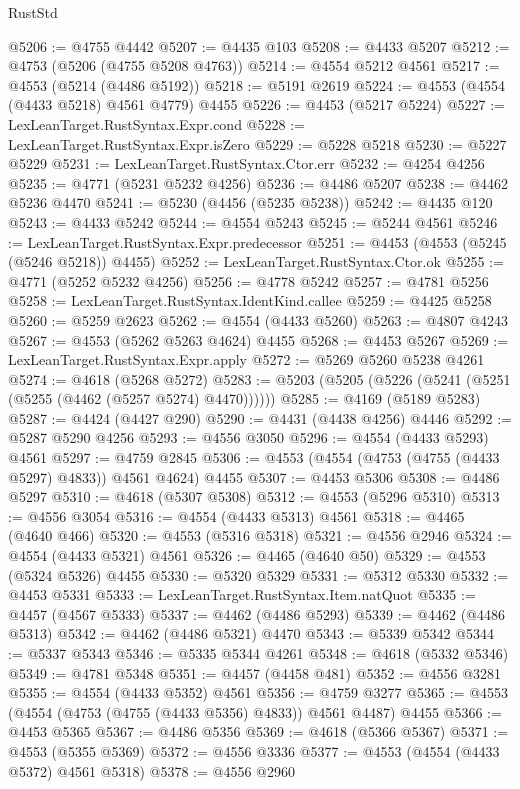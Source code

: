 \begin{lexlean}{RustStd}
\begin{coremodule}
@5206 := @4755 @4442
@5207 := @4435 @103
@5208 := @4433 @5207
@5212 := @4753 (@5206 (@4755 @5208 @4763))
@5214 := @4554 @5212 @4561
@5217 := @4553 (@5214 (@4486 @5192))
@5218 := @5191 @2619
@5224 := @4553 (@4554 (@4433 @5218) @4561 @4779) @4455
@5226 := @4453 (@5217 @5224)
@5227 := LexLeanTarget.RustSyntax.Expr.cond
@5228 := LexLeanTarget.RustSyntax.Expr.isZero
@5229 := @5228 @5218
@5230 := @5227 @5229
@5231 := LexLeanTarget.RustSyntax.Ctor.err
@5232 := @4254 @4256
@5235 := @4771 (@5231 @5232 @4256)
@5236 := @4486 @5207
@5238 := @4462 @5236 @4470
@5241 := @5230 (@4456 (@5235 @5238))
@5242 := @4435 @120
@5243 := @4433 @5242
@5244 := @4554 @5243
@5245 := @5244 @4561
@5246 := LexLeanTarget.RustSyntax.Expr.predecessor
@5251 := @4453 (@4553 (@5245 (@5246 @5218)) @4455)
@5252 := LexLeanTarget.RustSyntax.Ctor.ok
@5255 := @4771 (@5252 @5232 @4256)
@5256 := @4778 @5242
@5257 := @4781 @5256
@5258 := LexLeanTarget.RustSyntax.IdentKind.callee
@5259 := @4425 @5258
@5260 := @5259 @2623
@5262 := @4554 (@4433 @5260)
@5263 := @4807 @4243
@5267 := @4553 (@5262 @5263 @4624) @4455
@5268 := @4453 @5267
@5269 := LexLeanTarget.RustSyntax.Expr.apply
@5272 := @5269 @5260 @5238 @4261
@5274 := @4618 (@5268 @5272)
@5283 := @5203 (@5205 (@5226 (@5241 (@5251 (@5255 (@4462 (@5257 @5274) @4470))))))
@5285 := @4169 (@5189 @5283)
@5287 := @4424 (@4427 @290)
@5290 := @4431 (@4438 @4256) @4446
@5292 := @5287 @5290 @4256
@5293 := @4556 @3050
@5296 := @4554 (@4433 @5293) @4561
@5297 := @4759 @2845
@5306 := @4553 (@4554 (@4753 (@4755 (@4433 @5297) @4833)) @4561 @4624) @4455
@5307 := @4453 @5306
@5308 := @4486 @5297
@5310 := @4618 (@5307 @5308)
@5312 := @4553 (@5296 @5310)
@5313 := @4556 @3054
@5316 := @4554 (@4433 @5313) @4561
@5318 := @4465 (@4640 @466)
@5320 := @4553 (@5316 @5318)
@5321 := @4556 @2946
@5324 := @4554 (@4433 @5321) @4561
@5326 := @4465 (@4640 @50)
@5329 := @4553 (@5324 @5326) @4455
@5330 := @5320 @5329
@5331 := @5312 @5330
@5332 := @4453 @5331
@5333 := LexLeanTarget.RustSyntax.Item.natQuot
@5335 := @4457 (@4567 @5333)
@5337 := @4462 (@4486 @5293)
@5339 := @4462 (@4486 @5313)
@5342 := @4462 (@4486 @5321) @4470
@5343 := @5339 @5342
@5344 := @5337 @5343
@5346 := @5335 @5344 @4261
@5348 := @4618 (@5332 @5346)
@5349 := @4781 @5348
@5351 := @4457 (@4458 @481)
@5352 := @4556 @3281
@5355 := @4554 (@4433 @5352) @4561
@5356 := @4759 @3277
@5365 := @4553 (@4554 (@4753 (@4755 (@4433 @5356) @4833)) @4561 @4487) @4455
@5366 := @4453 @5365
@5367 := @4486 @5356
@5369 := @4618 (@5366 @5367)
@5371 := @4553 (@5355 @5369)
@5372 := @4556 @3336
@5377 := @4553 (@4554 (@4433 @5372) @4561 @5318)
@5378 := @4556 @2960

\end{coremodule}
\end{lexlean}
